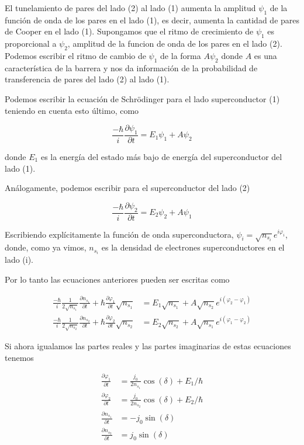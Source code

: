 El tunelamiento de pares del lado (2) al lado (1) aumenta la amplitud $\psi_1$ de la función de onda de los pares en el lado (1), es decir, aumenta la cantidad de pares de Cooper en el lado (1). Supongamos que el ritmo de crecimiento de $\psi_1$ es proporcional a $\psi_2$, amplitud de la funcion de onda de los pares en el lado (2). Podemos escribir el ritmo de cambio de $\psi_1$ de la forma $A \psi_2$ donde $A$ es una característica de la barrera y nos da información de la probabilidad de transferencia de pares del lado (2) al lado (1).

Podemos escribir la ecuación de Schrödinger para el lado superconductor (1) teniendo en cuenta esto último, como

\begin{equation}
    \frac{-\hbar}{i} \frac{\partial \psi_1}{\partial t} = E_1 \psi_1 + A \psi_2
\end{equation}

donde $E_1$ es la energía del estado más bajo de energía del superconductor del lado (1).

Análogamente, podemos escribir para el superconductor del lado (2)

\begin{equation}
    \frac{-\hbar}{i} \frac{\partial \psi_2}{\partial t} = E_2 \psi_2 + A \psi_1
\end{equation}

Escribiendo explícitamente la función de onda superconductora, $\psi_i = \sqrt{n_{s_i}} e^{i \varphi_i}$, donde, como ya vimos, $n_{s_i}$ es la densidad de electrones superconductores en el lado (i).

Por lo tanto las ecuaciones anteriores pueden ser escritas como

\begin{align}
    \frac{-\hbar}{i} \frac{1}{2 \sqrt{n_{s_1}}} \frac{\partial n_{s_1}}{\partial t} + \hbar \frac{\partial \varphi_1}{\partial t} \sqrt{n_{s_1}} &= E_1 \sqrt{n_{s_1}} + A \sqrt{n_{s_2}} e^{i (\varphi_2 - \varphi_1)} \\
    \frac{-\hbar}{i} \frac{1}{2 \sqrt{n_{s_2}}} \frac{\partial n_{s_2}}{\partial t} + \hbar \frac{\partial \varphi_2}{\partial t} \sqrt{n_{s_2}} &= E_2 \sqrt{n_{s_2}} + A \sqrt{n_{s_1}} e^{i (\varphi_1 - \varphi_2)}
\end{align}


Si ahora igualamos las partes reales y las partes imaginarias de estas ecuaciones tenemos

\begin{align}
    \frac{\partial \varphi_1}{\partial t} &= \frac{j_0}{2 n_{s_1}} \cos(\delta) + E_1/\hbar \\
    \frac{\partial \varphi_2}{\partial t} &= \frac{j_0}{2 n_{s_2}} \cos(\delta) + E_2/\hbar \\
    \frac{\partial n_{s_1}}{\partial t} &= -j_0 \sin(\delta) \\
    \frac{\partial n_{s_2}}{\partial t} &= j_0 \sin(\delta)
\end{align}


